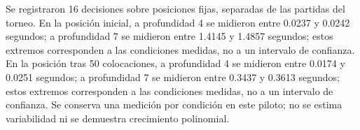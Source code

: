Se registraron 16 decisiones sobre posiciones fijas, separadas de las partidas del torneo. 
En la posición inicial, 
a profundidad 4 se midieron entre 0.0237 y 0.0242 segundos; 
a profundidad 7 se midieron entre 1.4145 y 1.4857 segundos; 
estos extremos corresponden a las condiciones medidas, no a un intervalo de confianza. 
En la posición tras 50 colocaciones, 
a profundidad 4 se midieron entre 0.0174 y 0.0251 segundos; 
a profundidad 7 se midieron entre 0.3437 y 0.3613 segundos; 
estos extremos corresponden a las condiciones medidas, no a un intervalo de confianza. 
Se conserva una medición por condición en este piloto; no se estima variabilidad ni se demuestra crecimiento polinomial.
